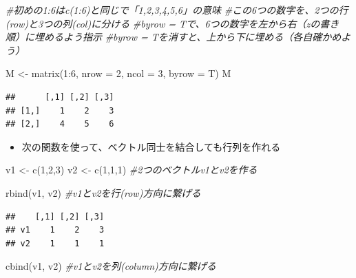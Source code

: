 \documentclass[
]{book}
\newenvironment{Shaded}{\begin{snugshade}}{\end{snugshade}}
\newcommand{\AttributeTok}[1]{\textcolor[rgb]{0.77,0.63,0.00}{#1}}
\newcommand{\CommentTok}[1]{\textcolor[rgb]{0.56,0.35,0.01}{\textit{#1}}}
\newcommand{\DecValTok}[1]{\textcolor[rgb]{0.00,0.00,0.81}{#1}}
\newcommand{\FunctionTok}[1]{\textcolor[rgb]{0.00,0.00,0.00}{#1}}
\newcommand{\NormalTok}[1]{#1}
\newcommand{\OtherTok}[1]{\textcolor[rgb]{0.56,0.35,0.01}{#1}}
\newcommand{\SpecialCharTok}[1]{\textcolor[rgb]{0.00,0.00,0.00}{#1}}
\providecommand{\tightlist}{%
  \setlength{\itemsep}{0pt}\setlength{\parskip}{0pt}}
\begin{document}
\begin{Shaded}
\begin{Highlighting}[]
\CommentTok{\#初めの1:6はc(1:6)と同じで「1,2,3,4,5,6」の意味}
\CommentTok{\#この6つの数字を、2つの行(row)と3つの列(col)に分ける}
\CommentTok{\#byrow = Tで、6つの数字を左から右（zの書き順）に埋めるよう指示}
\CommentTok{\#byrow = Tを消すと、上から下に埋める（各自確かめよう）}

\NormalTok{M }\OtherTok{\textless{}{-}} \FunctionTok{matrix}\NormalTok{(}\DecValTok{1}\SpecialCharTok{:}\DecValTok{6}\NormalTok{, }\AttributeTok{nrow =} \DecValTok{2}\NormalTok{, }\AttributeTok{ncol =} \DecValTok{3}\NormalTok{, }\AttributeTok{byrow =}\NormalTok{ T)}
\NormalTok{M}
\end{Highlighting}
\end{Shaded}

\begin{verbatim}
##      [,1] [,2] [,3]
## [1,]    1    2    3
## [2,]    4    5    6
\end{verbatim}

\begin{itemize}
\tightlist
\item
  次の関数を使って、ベクトル同士を結合しても行列を作れる
\end{itemize}

\begin{Shaded}
\begin{Highlighting}[]
\NormalTok{v1 }\OtherTok{\textless{}{-}} \FunctionTok{c}\NormalTok{(}\DecValTok{1}\NormalTok{,}\DecValTok{2}\NormalTok{,}\DecValTok{3}\NormalTok{) }
\NormalTok{v2 }\OtherTok{\textless{}{-}} \FunctionTok{c}\NormalTok{(}\DecValTok{1}\NormalTok{,}\DecValTok{1}\NormalTok{,}\DecValTok{1}\NormalTok{) }\CommentTok{\#2つのベクトルv1とv2を作る}

\FunctionTok{rbind}\NormalTok{(v1, v2) }\CommentTok{\#v1とv2を行(row)方向に繋げる}
\end{Highlighting}
\end{Shaded}

\begin{verbatim}
##    [,1] [,2] [,3]
## v1    1    2    3
## v2    1    1    1
\end{verbatim}

\begin{Shaded}
\begin{Highlighting}[]
\FunctionTok{cbind}\NormalTok{(v1, v2) }\CommentTok{\#v1とv2を列(column)方向に繋げる}
\end{Highlighting}
\end{Shaded}
\end{document}
